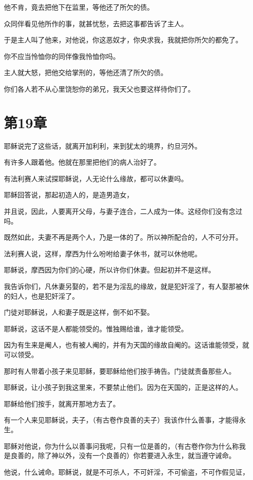 \documentclass[12pt,oneside]{book}
\begin{document}
他不肯，竟去把他下在监里，等他还了所欠的债。

众同伴看见他所作的事，就甚忧愁，去把这事都告诉了主人。

于是主人叫了他来，对他说，你这恶奴才，你央求我，我就把你所欠的都免了。

你不应当怜恤你的同伴像我怜恤你吗。

主人就大怒，把他交给掌刑的，等他还清了所欠的债。

你们各人若不从心里饶恕你的弟兄，我天父也要这样待你们了。

\chapter{第19章}
耶稣说完了这些话，就离开加利利，来到犹太的境界，约旦河外。

有许多人跟着他。他就在那里把他们的病人治好了。

有法利赛人来试探耶稣说，人无论什么缘故，都可以休妻吗。

耶稣回答说，那起初造人的，是造男造女，

并且说，因此，人要离开父母，与妻子连合，二人成为一体。这经你们没有念过吗。

既然如此，夫妻不再是两个人，乃是一体的了。所以神所配合的，人不可分开。

法利赛人说，这样，摩西为什么吩咐给妻子休书，就可以休他呢。

耶稣说，摩西因为你们的心硬，所以许你们休妻。但起初并不是这样。

我告诉你们，凡休妻另娶的，若不是为淫乱的缘故，就是犯奸淫了，有人娶那被休的妇人，也是犯奸淫了。

门徒对耶稣说，人和妻子既是这样，倒不如不娶。

耶稣说，这话不是人都能领受的。惟独赐给谁，谁才能领受。

因为有生来是阉人，也有被人阉的，并有为天国的缘故自阉的。这话谁能领受，就可以领受。

那时有人带着小孩子来见耶稣，要耶稣给他们按手祷告。门徒就责备那些人。

耶稣说，让小孩子到我这里来，不要禁止他们。因为在天国的，正是这样的人。

耶稣给他们按手，就离开那地方去了。

有一个人来见耶稣说，夫子，（有古卷作良善的夫子）我该作什么善事，才能得永生。

耶稣对他说，你为什么以善事问我呢，只有一位是善的，（有古卷作你为什么称我是良善的，除了神以外，没有一个良善的）你若要进入永生，就当遵守诫命。

他说，什么诫命。耶稣说，就是不可杀人，不可奸淫，不可偷盗，不可作假见证，
\end{document}
